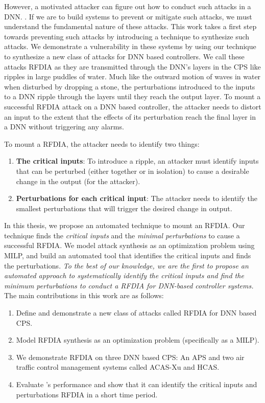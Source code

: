 However, a motivated attacker can figure out how to conduct such attacks in a \ac{DNN}. . 
If we are to build systems to prevent or mitigate such attacks, we must understand the fundamental nature of these attacks. 
This work takes a first step towards preventing such attacks by introducing a technique to synthesize such attacks. 
We demonstrate a vulnerability in these systems by using our technique to synthesize a new class of attacks for DNN based controllers. 
We call these attacks \ac{RFDIA} as they are transmitted through the DNN's layers in the CPS like ripples in large puddles of water. 
Much like the outward motion of waves in water when disturbed by dropping a stone, the perturbations introduced to the inputs to a DNN ripple through the layers until they reach the output layer. 
To mount a successful \ac{RFDIA} attack on a DNN based controller, the attacker needs to distort an input to the extent that the effects of its perturbation reach the final layer in a DNN without triggering any alarms. 


To mount a \ac{RFDIA}, the attacker needs to identify two things: 
\begin{enumerate}
	\item \textbf{The critical inputs}: To introduce a ripple, an attacker must identify inputs that can be perturbed (either together or in isolation) to cause a desirable change in the output (for the attacker).
	\item \textbf{Perturbations for each critical input}: The attacker needs to identify the smallest perturbations that will trigger the desired change in output. 
\end{enumerate}


In this thesis, we propose an automated technique to mount an  \ac{RFDIA}.
Our technique finds the \textit{critical inputs} and the \textit{minimal perturbations} to cause a successful \ac{RFDIA}. 
We model attack synthesis as an optimization problem using \ac{MILP}, and build an automated tool \tool that identifies the critical inputs and finds the perturbations.
{\em To the best of our knowledge, we are the first to  propose an automated approach to systematically identify the critical inputs and find the minimum perturbations to conduct a \ac{RFDIA} for DNN-based controller systems.
}
The main contributions in this work are as follows:

\begin{enumerate}
	\item Define and demonstrate a new class of attacks called \ac{RFDIA} for \ac{DNN} based \ac{CPS}. 
	\item Model \ac{RFDIA} synthesis as an optimization problem (specifically as a \ac{MILP}). 
	\item We demonstrate \ac{RFDIA} on three \ac{DNN} based \ac{CPS}:  An \ac{APS} and two air traffic control management systems called \ac{ACAS-Xu} and \ac{HCAS}.
	\item Evaluate \tool's performance and show that it can identify the critical inputs and perturbations \ac{RFDIA} in a short time period.  
\end{enumerate}

